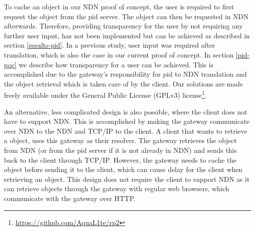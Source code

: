 To cache an object in our NDN proof of concept, the user is required to first request the object from the \gls{pid} server. The object can then be requested in NDN afterwards. Therefore, providing transparency for the user by not requiring any further user input, has not been implemented but can be achieved as described in section \ref{results-pid}. In a previous study, user input was required after translation, which is also the case in our current proof of concept. In section \ref{pid-poc} we describe how transparency for a user can be achieved. This is accomplished due to the gateway’s responsibility for \gls{pid} to NDN translation and the object retrieval which is taken care of by the client. Our solutions are made freely available under the General Public License (GPLv3) license\footnote{\url{https://github.com/AquaL1te/rp2}}.

An alternative, less complicated design is also possible, where the client does not have to support NDN. This is accomplished by making the gateway communicate over NDN to the NDN and TCP/IP to the client. A client that wants to retrieve a object, uses this gateway as their resolver. The gateway retrieves the object from NDN (or from the \gls{pid} server if it is not already in NDN) and sends this back to the client through TCP/IP. However, the gateway needs to cache the object before sending it to the client, which can cause delay for the client when retrieving an object. This design does not require the client to support NDN as it can retrieve objects through the gateway with regular web browsers, which communicate with the gateway over HTTP. 

















